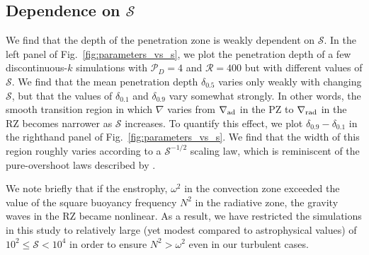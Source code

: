 \documentclass[twocolumn]{aastex631}
\newcommand{\gradrad}{\ensuremath{\nabla_{\rm{rad}}}}
\newcommand{\gradad}{\ensuremath{\nabla_{\rm{ad}}}}
\newcommand{\justgrad}{\ensuremath{\nabla}}
\newcommand{\mP}{\ensuremath{\mathcal{P}}}
\newcommand{\mR}{\ensuremath{\mathcal{R}}}
\newcommand{\mS}{\ensuremath{\mathcal{S}}}
\begin{document}
\subsection{Dependence on $\mS$}

We find that the depth of the penetration zone is weakly dependent on $\mS$.
In the left panel of Fig.~\ref{fig:parameters_vs_s}, we plot the penetration depth of a few discontinuous-$k$ simulations with $\mP_D = 4$ and $\mR = 400$ but with different values of $\mS$.
We find that the mean penetration depth $\delta_{0.5}$ varies only weakly with changing $\mS$, but that the values of $\delta_{0.1}$ and $\delta_{0.9}$ vary somewhat strongly.
In other words, the smooth transition region in which $\justgrad$ varies from $\gradad$ in the PZ to $\gradrad$ in the RZ becomes narrower as $\mS$ increases.
To quantify this effect, we plot $\delta_{0.9} - \delta_{0.1}$ in the righthand panel of Fig.~\ref{fig:parameters_vs_s}.
We find that the width of this region roughly varies according to a $\mS^{-1/2}$ scaling law, which is reminiscent of the pure-overshoot laws described by \citet{korre_etal_2019}.

We note briefly that if the enstrophy, $\omega^2$ in the convection zone exceeded the value of the square buoyancy frequency $N^2$ in the radiative zone, the gravity waves in the RZ became nonlinear.
As a result, we have restricted the simulations in this study to relatively large (yet modest compared to astrophysical values) of $10^{2} \leq \mS < 10^4$ in order to ensure $N^2 > \omega^2$ even in our turbulent cases.
\end{document}
